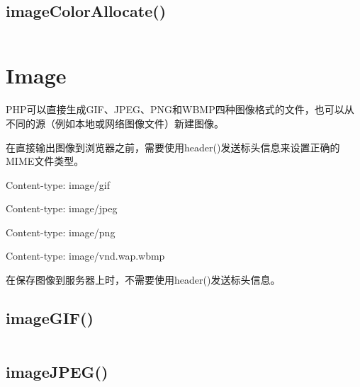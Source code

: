 \subsection{imageColorAllocate()}



\begin{lstlisting}[language=PHP]

\end{lstlisting}

\section{Image}




PHP可以直接生成GIF、JPEG、PNG和WBMP四种图像格式的文件，也可以从不同的源（例如本地或网络图像文件）新建图像。


在直接输出图像到浏览器之前，需要使用header()发送标头信息来设置正确的MIME文件类型。

\begin{compactitem}
\item Content-type: image/gif
\item Content-type: image/jpeg
\item Content-type: image/png
\item Content-type: image/vnd.wap.wbmp
\end{compactitem}

在保存图像到服务器上时，不需要使用header()发送标头信息。





\subsection{imageGIF()}






\begin{lstlisting}[language=PHP]

\end{lstlisting}


\subsection{imageJPEG()}


\begin{lstlisting}[language=PHP]

\end{lstlisting}

